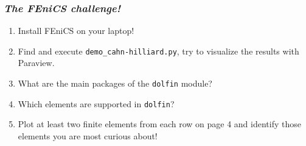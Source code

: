 \begin{frame}
  \frametitle{\emph{The FEniCS challenge!}}
 \begin{center}
      \begin{enumerate}
          \item Install FEniCS on your laptop!
              \\
              \vspace{1em}
              \vspace{1em}
            \item Find and execute \texttt{demo\_cahn-hilliard.py},
              try to visualize the results with Paraview.
          \item What are the main packages of the \texttt{dolfin}
              module?
          \item Which elements are supported in \texttt{dolfin}?
          \item Plot at least two finite elements from each row on page 4
              and identify those elements you are most curious about!
      \end{enumerate}
  \end{center}
\end{frame}
